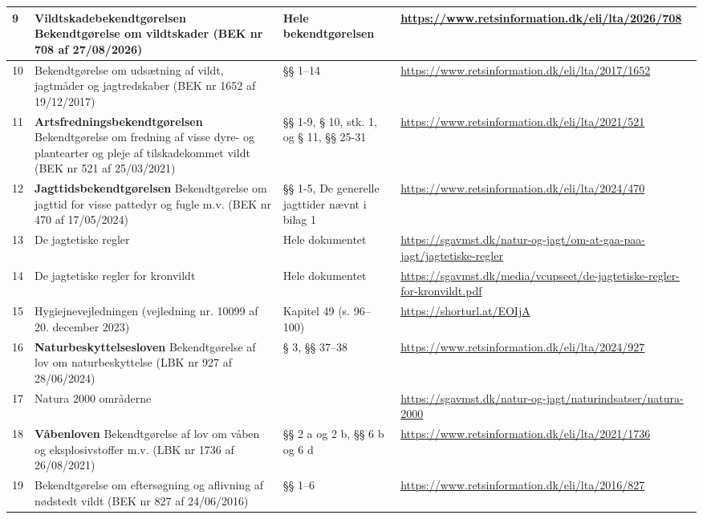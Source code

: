 \documentclass[10pt,a4paper]{article}
\begin{document}
{\begin{tabular}{|P{1.2cm}|P{5.5cm}|P{3.5cm}|P{6.5cm}|}
9 & \textbf{Vildtskadebekendtgørelsen} Bekendtgørelse om vildtskader (BEK nr 708 af 27/08/2026) & Hele bekendtgørelsen & \url{https://www.retsinformation.dk/eli/lta/2026/708} \\
\hline

10 & Bekendtgørelse om udsætning af vildt, jagtmåder og jagtredskaber (BEK nr 1652 af 19/12/2017) & §§ 1–14 & \url{https://www.retsinformation.dk/eli/lta/2017/1652} \\
\hline

11 & \textbf{Artsfredningsbekendtgørelsen} Bekendtgørelse om fredning af visse dyre- og plantearter og pleje af tilskadekommet vildt (BEK nr 521 af 25/03/2021) & §§ 1-9, § 10, stk. 1, og § 11, §§ 25-31 & \url{https://www.retsinformation.dk/eli/lta/2021/521} \\
\hline

12 & \textbf{Jagttidsbekendtgørelsen} Bekendtgørelse om jagttid for visse pattedyr og fugle m.v. (BEK nr 470 af 17/05/2024) & §§ 1-5, De generelle jagttider nævnt i bilag 1 & \url{https://www.retsinformation.dk/eli/lta/2024/470} \\
\hline

13 & De jagtetiske regler & Hele dokumentet & \url{https://sgavmst.dk/natur-og-jagt/om-at-gaa-paa-jagt/jagtetiske-regler} \\
\hline

14 & De jagtetiske regler for kronvildt & Hele dokumentet & \url{https://sgavmst.dk/media/vcupseet/de-jagtetiske-regler-for-kronvildt.pdf} \\
\hline

15 & Hygiejnevejledningen (vejledning nr. 10099 af 20. december 2023) & Kapitel 49 (s. 96–100) & \url{https://shorturl.at/EOIjA} \\
\hline

16 & \textbf{Naturbeskyttelsesloven} Bekendtgørelse af lov om naturbeskyttelse (LBK nr 927 af 28/06/2024) & § 3, §§ 37–38  & \url{https://www.retsinformation.dk/eli/lta/2024/927} \\
\hline

17 & Natura 2000 områderne & & \url{https://sgavmst.dk/natur-og-jagt/naturindsatser/natura-2000} \\
\hline

18 & \textbf{Våbenloven} Bekendtgørelse af lov om våben og eksplosivstoffer m.v. (LBK nr 1736 af 26/08/2021) & §§ 2 a og 2 b, §§ 6 b og 6 d & \url{https://www.retsinformation.dk/eli/lta/2021/1736} \\
\hline

19 & Bekendtgørelse om eftersøgning og aflivning af nødstedt vildt (BEK nr 827 af 24/06/2016) & §§ 1–6 & \url{https://www.retsinformation.dk/eli/lta/2016/827} \\
\hline

\end{tabular}
}

\vspace{1cm}
\end{document}
